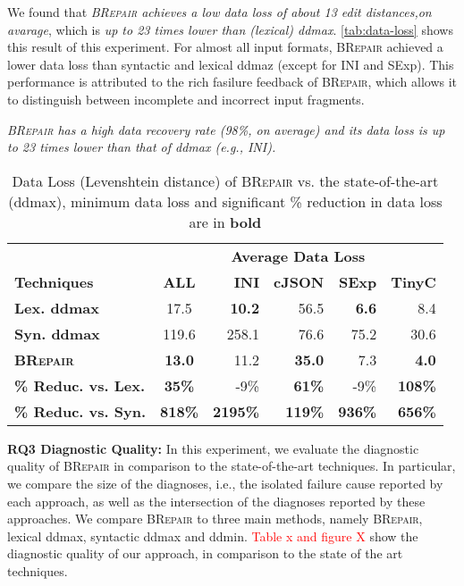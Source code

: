 \documentclass[sigconf,review,anonymous]{acmart}
\newenvironment{result}{\begin{framed}\centering\it}{\end{framed}}
\newcommand{\recheck}[1]{\textcolor{red}{#1}}
\newcommand{\approach}{\textsc{BRepair}\xspace}
\begin{document}
We found that \textit{\approach achieves a low data loss of about 13 edit distances,on avarage},  which is \textit{up to 23 times lower than (lexical) ddmax}. \autoref{tab:data-loss} shows this result of this experiment. For almost all input formats, \approach achieved a lower data loss than syntactic and lexical ddmaz (except for INI and SExp). This performance is attributed to the rich fasilure feedback of \approach, which allows it to distinguish between incomplete and incorrect input fragments. 

\begin{result}
\approach has a high data recovery rate (98\%, on average) and its data %
loss is up to 23 times lower than that of ddmax (e.g., INI).     
\end{result}


\begin{table}[!tbp]\centering
\caption{Data Loss (Levenshtein distance) of \approach vs. the state-of-the-art (ddmax), minimum data loss and significant \% reduction in data loss are in \textbf{bold}}
\begin{tabular}{|l | c | r  r  r  r |}
\hline
&  \multicolumn{5}{c|}{\textbf{Average Data Loss }}  \\
\textbf{Techniques} & \textbf{ALL} & \textbf{INI} & \textbf{cJSON} & \textbf{SExp} & \textbf{TinyC} \\
\hline
\textbf{Lex. ddmax} & 17.5 & \textbf{10.2} &	56.5 &	\textbf{6.6} &	 8.4 \\	
\textbf{Syn. ddmax} & 119.6 &  258.1 & 76.6 &	75.2 &	30.6 \\
\textbf{\approach} & \textbf{13.0}  & 11.2 &	\textbf{35.0} &	7.3 & \textbf{4.0} \\
\hline
\textbf{\% Reduc. vs. Lex.} & \textbf{35\%} &  -9\% & \textbf{61\%} & -9\% & \textbf{108\%} \\
\textbf{\% Reduc. vs. Syn.} & \textbf{818\%} & \textbf{2195\%} &	\textbf{119\%} & \textbf{936\%} &\textbf{ 656\%} \\
\hline
\end{tabular}
\label{tab:data-loss}
\end{table}


\noindent
\textbf{RQ3 Diagnostic Quality:} 
In this experiment, we evaluate the diagnostic quality of \approach in comparison to the state-of-the-art techniques. In particular, we compare the size of the diagnoses, i.e., the isolated failure cause reported by each approach, as well as the intersection of the diagnoses reported by these approaches. We compare \approach to three main methods, namely \approach, lexical ddmax, syntactic ddmax and ddmin.  \recheck{Table x and figure X} show the diagnostic quality of our approach, in comparison to the state of the art techniques. 
\end{document}
